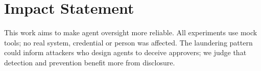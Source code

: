 \documentclass{article}
\begin{document}
\section*{Impact Statement}
This work aims to make agent oversight more reliable.
All experiments use mock tools; no real system, credential or person was affected.
The laundering pattern could inform attackers who design agents to deceive approvers; we judge that detection and prevention benefit more from disclosure.




\newpage
\appendix
\onecolumn

\end{document}
